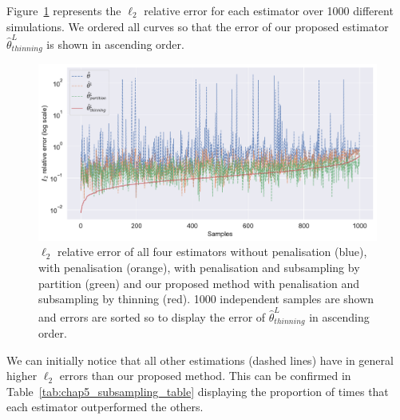     Figure~\ref{fig:chap5_l2_error_subsampling} represents the $\ell_2$ relative error for each estimator over 1000 different simulations. 
    We ordered all curves so that the error of our proposed estimator $\hat \theta^L_{thinning}$ is shown in ascending order.

    \begin{figure}[!ht]
        \centering
        \includegraphics[width=1.0\textwidth]{images/chapter5/l2_error_subsampling.pdf} 
        \caption{$\ell_2$ relative error of all four estimators without penalisation (blue), with penalisation (orange), with penalisation and subsampling by partition (green) and our proposed method with penalisation and subsampling by thinning (red).
        1000 independent samples are shown and errors are sorted so to display the error of $\hat \theta^L_{thinning}$ in ascending order. 
        }
        \label{fig:chap5_l2_error_subsampling}
    \end{figure}

    We can initially notice that all other estimations (dashed lines) have in general higher $\ell_2$ errors than our proposed method.
    This can be confirmed in Table~\ref{tab:chap5_subsampling_table} displaying the proportion of times that each estimator outperformed the others.

